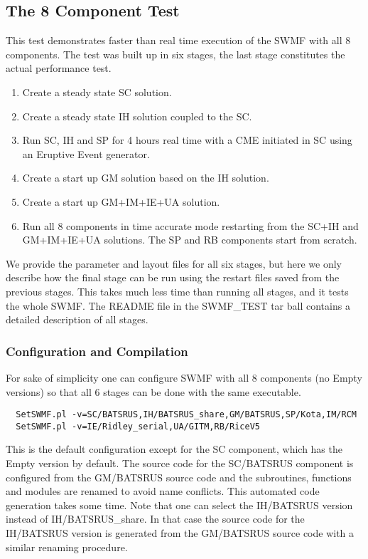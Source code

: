 \documentclass[twoside,10pt]{article}
\begin{document}
\subsection{The 8 Component Test}

This test demonstrates faster than real time execution of the
SWMF with all 8 components. The test was built up in six stages,
the last stage constitutes the actual performance test.
\begin{enumerate}
\item Create a steady state SC solution.
\item Create a steady state IH solution coupled to the SC.
\item Run SC, IH and SP for 4 hours real time with 
      a CME initiated in SC using an Eruptive Event generator.
\item Create a start up GM solution based on the IH solution.
\item Create a start up GM+IM+IE+UA solution.
\item Run all 8 components in time accurate mode restarting from the
      SC+IH and GM+IM+IE+UA solutions. 
      The SP and RB components start from scratch.
\end{enumerate}
We provide the parameter and layout files for all six stages,
but here we only describe how the final stage can be run using
the restart files saved from the previous stages.
This takes much less time than running all stages, 
and it tests the whole SWMF. The README file in the SWMF\_TEST
tar ball contains a detailed description of all stages.

\subsubsection{Configuration and Compilation}

For sake of simplicity one can configure SWMF with all 8 components
(no Empty versions) so that all 6 stages can be done with the same
executable. 
\begin{verbatim}
  SetSWMF.pl -v=SC/BATSRUS,IH/BATSRUS_share,GM/BATSRUS,SP/Kota,IM/RCM
  SetSWMF.pl -v=IE/Ridley_serial,UA/GITM,RB/RiceV5
\end{verbatim}
This is the default configuration except for the SC
component, which has the Empty version by default.
The source code for the SC/BATSRUS component is configured 
from the GM/BATSRUS source code and the subroutines, functions and 
modules are renamed to avoid name conflicts. This automated code
generation takes some time.
Note that one can select the IH/BATSRUS version instead of IH/BATSRUS\_share.
In that case the source code for the IH/BATSRUS version is generated 
from the GM/BATSRUS source code with a similar renaming procedure.
\end{document}
